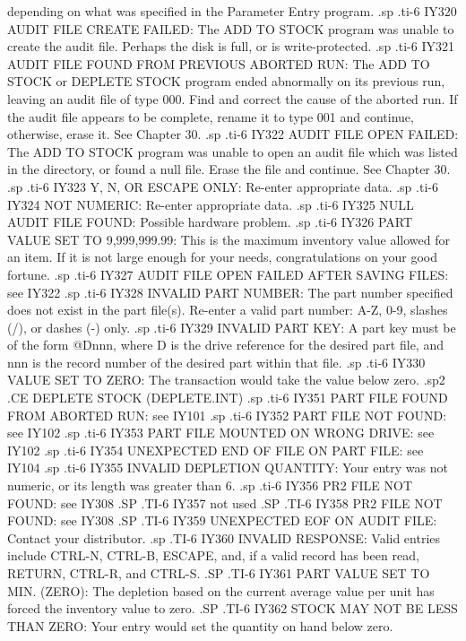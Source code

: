depending on what was specified in the Parameter Entry program.
.sp
.ti-6
IY320 AUDIT FILE CREATE FAILED: The ADD TO STOCK program
was unable to create the audit
file.  Perhaps the disk is full, or is write-protected.
.sp
.ti-6
IY321 AUDIT FILE FOUND FROM PREVIOUS ABORTED RUN:  The ADD TO STOCK or
DEPLETE STOCK program ended abnormally on its previous run, leaving an audit
file of type 000.  Find and correct the cause of the aborted run.  If the
audit file appears to be complete, rename it to type 001 and continue,
otherwise, erase it.  See Chapter 30.
.sp
.ti-6
IY322 AUDIT FILE OPEN FAILED:  The ADD TO STOCK program
was unable to open an audit file
which was listed in the directory, or found a null file.  Erase the file
and continue. See Chapter 30.
.sp
.ti-6
IY323 Y, N, OR ESCAPE ONLY: Re-enter appropriate data.
.sp
.ti-6
IY324 NOT NUMERIC: Re-enter appropriate data.
.sp
.ti-6
IY325 NULL AUDIT FILE FOUND: Possible hardware problem.
.sp
.ti-6
IY326 PART VALUE SET TO 9,999,999.99: This is the maximum inventory value
allowed for an item.  If it is not large enough for your needs, congratulations
on your good fortune.
.sp
.ti-6
IY327 AUDIT FILE OPEN FAILED AFTER SAVING FILES: see IY322
.sp
.ti-6
IY328 INVALID PART NUMBER: The part number specified does not exist in
the part file(s). Re-enter a valid part number: A-Z, 0-9, slashes (/), or
dashes (-) only.
.sp
.ti-6
IY329 INVALID PART KEY: A part key must be of the form @Dnnn, where
D is the drive reference for the desired part file, and nnn is the record
number of the desired part within that file.
.sp
.ti-6
IY330 VALUE SET TO ZERO: The transaction would take the value below zero.
.sp2
.CE
DEPLETE STOCK (DEPLETE.INT)
.sp
.ti-6
IY351 PART FILE FOUND FROM ABORTED RUN: see IY101
.sp
.ti-6
IY352 PART FILE NOT FOUND: see IY102
.sp
.ti-6
IY353 PART FILE MOUNTED ON WRONG DRIVE: see IY102
.sp
.ti-6
IY354 UNEXPECTED END OF FILE ON PART FILE: see IY104
.sp
.ti-6
IY355 INVALID DEPLETION QUANTITY: Your entry was not numeric, or its length
was greater than 6.
.sp
.ti-6
IY356 PR2 FILE NOT FOUND: see IY308
.SP
.TI-6
IY357 not used
.SP
.TI-6
IY358 PR2 FILE NOT FOUND: see IY308
.SP
.TI-6
IY359 UNEXPECTED EOF ON AUDIT FILE: Contact your distributor.
.sp
.TI-6
IY360 INVALID RESPONSE: Valid entries include CTRL-N, CTRL-B, ESCAPE,
and, if a valid
record has been read, RETURN, CTRL-R, and CTRL-S.
.SP
.TI-6
IY361 PART VALUE SET TO MIN. (ZERO): The depletion based on the current
average value per unit has forced the inventory value to zero.
.SP
.TI-6
IY362 STOCK MAY NOT BE LESS THAN ZERO: Your entry would set the quantity
on hand below zero.
